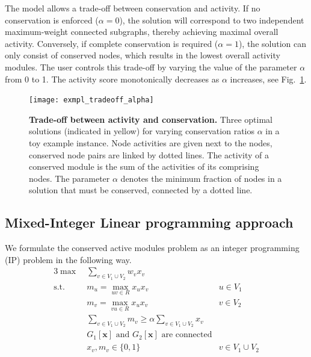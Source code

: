 		The model allows a trade-off between conservation and activity.
		If no conservation is enforced ($\alpha = 0$), the solution will correspond to two independent maximum-weight connected subgraphs, thereby achieving maximal overall activity.
		Conversely, if complete conservation is required ($\alpha = 1$), the solution can only consist of conserved nodes, which results in the lowest overall activity modules.
		The user controls this trade-off by varying the value of the parameter $\alpha$ from 0 to 1.
		The activity score monotonically decreases as $\alpha$ increases, see Fig.~\ref{fig:exmpl_tradeoff_alpha}.

		\begin{figure}[t]
			\centering
			\texttt{[image: exmpl\_tradeoff\_alpha]}
			\caption{\textbf{Trade-off between activity and conservation.}
				Three optimal solutions (indicated in yellow) for varying conservation ratios $\alpha$ in a toy example instance.
				Node activities are given next to the nodes, conserved node pairs are linked by dotted lines.
				The activity of a conserved module is the sum of the activities of its comprising nodes.
				The parameter $\alpha$ denotes the minimum fraction of nodes in a solution that must be conserved, \ie{} connected by a dotted line.
			}
			\label{fig:exmpl_tradeoff_alpha}
		\end{figure}

	\subsection{Mixed-Integer Linear programming approach}

		We formulate the conserved active modules problem as an integer programming (IP) problem in the following way.
		\allowdisplaybreaks
		\begin{alignat}{3}
		\label{eq:obj}           \max\: & \sum_{v \in V_1 \cup V_2} w_v x_v \\
		\label{eq:m_u}  \text{s.t.}\:\: & m_u = \max_{uv \in R}{x_u x_v} & u \in V_1\\
		\label{eq:m_v}                  & m_v = \max_{vu \in R}{x_u x_v} & v \in V_2\\
		\label{eq:b}                    & \sum_{v \in V_1 \cup V_2} m_v \geq \alpha \sum_{v \in V_1 \cup V_2} x_v &\\
		\label{eq:con}                  & \text{$G_1[\mathbf{x}]$ and $G_2[\mathbf{x}]$ are connected}&\\
		\label{eq:vars}                 & x_v, m_v \in \{0, 1\} & v \in V_1 \cup V_2
		\end{alignat}


